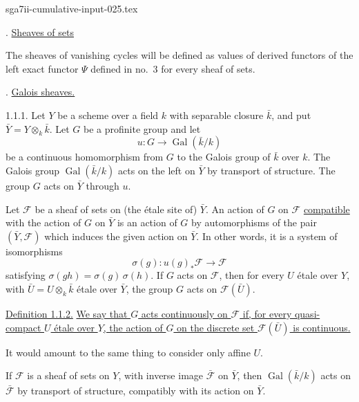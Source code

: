\begin{filecontents*}{sga7ii-cumulative-input-025.tex}

. \underline{Sheaves of sets}

The sheaves of vanishing cycles will be defined as values of derived
functors of the left exact functor $\Psi$ defined in no.~3 for every
sheaf of sets.

. \underline{Galois sheaves.}

1.1.1. Let $Y$ be a scheme over a field $k$ with separable closure
$\bar{k}$, and put $\bar{Y}=Y\otimes_k\bar{k}$.  Let $G$ be a profinite
group and let
\begin{equation*}
u:G\longrightarrow\operatorname{Gal}(\bar{k}/k)
\end{equation*}
be a continuous homomorphism from $G$ to the Galois group of $\bar{k}$
over $k$.  The Galois group $\operatorname{Gal}(\bar{k}/k)$ acts on the
left on $\bar{Y}$ by transport of structure.  The group $G$ acts on
$\bar{Y}$ through $u$.

Let $\mathcal F$ be a sheaf of sets on (the \'{e}tale site of) $\bar Y$.
An action of $G$ on $\mathcal F$ \underline{compatible} with the action
of $G$ on $\bar Y$ is an action of $G$ by automorphisms of the pair
$(\bar Y,\mathcal F)$ which induces the given action on $\bar Y$.  In
other words, it is a system of isomorphisms
\begin{equation*}
\sigma(g):u(g)_*\mathcal F\longrightarrow\mathcal F
\end{equation*}
satisfying $\sigma(gh)=\sigma(g)\,\sigma(h)$.  If $G$ acts on
$\mathcal F$, then for every $U$ \'{e}tale over $Y$, with
$\bar U=U\otimes_k\bar k$ \'{e}tale over $\bar Y$, the group $G$ acts on
$\mathcal F(\bar U)$.

\underline{Definition 1.1.2.} \underline{We say that $G$ acts
continuously on $\mathcal F$ if, for every quasi-compact $U$ \'{e}tale
over $Y$, the action of $G$ on the discrete set $\mathcal F(\bar U)$ is
continuous.}

It would amount to the same thing to consider only affine $U$.

If $\mathcal F$ is a sheaf of sets on $Y$, with inverse image
$\bar{\mathcal F}$ on $\bar Y$, then
$\operatorname{Gal}(\bar k/k)$ acts on $\bar{\mathcal F}$ by transport
of structure, compatibly with its action on $\bar Y$.


\end{filecontents*}
